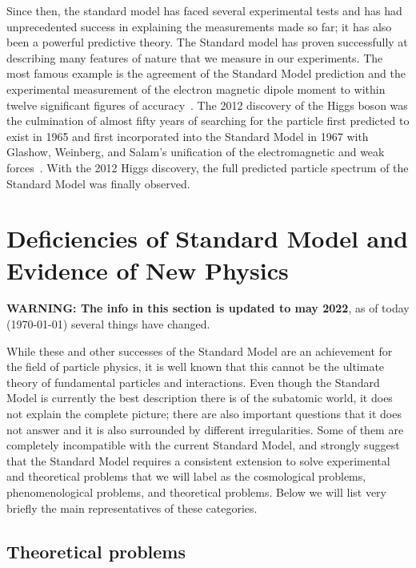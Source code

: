 Since then, the standard model has faced several experimental tests and has had unprecedented success in explaining the measurements made so far; it has also been a powerful predictive theory. The Standard model has proven  successfully at describing many features of nature that we measure in our experiments. The most famous example is the agreement of the Standard Model prediction and the experimental measurement of the electron magnetic dipole moment to within twelve  significant figures of accuracy~\parencite{PhysRevLett.97.030801}.  The 2012 discovery of the Higgs boson was the culmination of almost fifty years of searching for the particle first predicted to exist in 1965 and first incorporated into the Standard Model in 1967 with Glashow, Weinberg, and Salam's unification of the electromagnetic and weak forces~\parencite{PhysRevLett.19.1264, gl1961579}. With the 2012 Higgs discovery, the full predicted particle spectrum of the Standard Model was finally observed.


\section{Deficiencies of Standard Model and Evidence of New Physics}


{\Large \textbf{WARNING: The info in this section is updated to may 2022}, as of today (\today) several things have changed.}

While these and other successes of the Standard Model are an achievement for the field of particle physics, it is well known that this cannot be the ultimate theory of fundamental particles and interactions. Even though the Standard Model is currently the best description there is of the subatomic world, it does not explain the complete picture; there are also important questions that it does not answer and it is also surrounded by different irregularities. Some of them are completely incompatible with the current Standard Model, and strongly suggest that the Standard Model requires a consistent extension to solve experimental and theoretical problems that we will label as the cosmological problems, phenomenological problems, and theoretical problems. Below we will list very briefly the main representatives of these categories.



\subsection{Theoretical problems}

